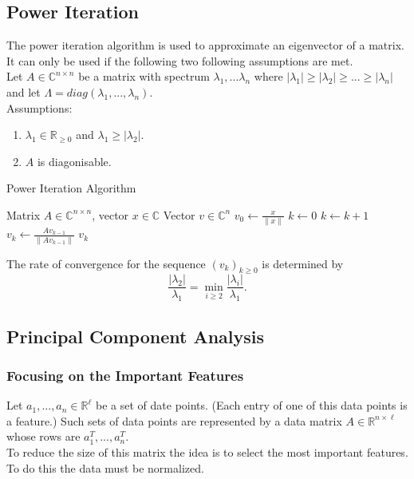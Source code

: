 \documentclass{panikzettel}
\begin{document}
\subsection{Power Iteration}
\begin{halfboxl}
\vspace{-\baselineskip}
  The power iteration algorithm is used to approximate an eigenvector of a matrix. It can only be used if the following two following assumptions are met.\\
  Let $A\in\mathbb{C}^{n\times n}$ be a matrix with spectrum $\lambda_1,...\lambda_n$ where $|\lambda_1|\geq |\lambda_2|\geq ... \geq |\lambda_n|$ and let $\Lambda = diag(\lambda_1,...,\lambda_n)$.\\
  Assumptions:
  \begin{enumerate}
  \item $\lambda_1\in\mathbb{R}_{\geq 0}$ and $\lambda_1\geq |\lambda_2|$.
  \item $A$ is diagonisable.
  \end{enumerate}
\end{halfboxl}
\begin{halfboxr}
\vspace{-\baselineskip}
\begin{algo}{Power Iteration Algorithm}
{
\renewcommand{\algorithmicrequire}{\textbf{Input:}}
\renewcommand{\algorithmicensure}{\textbf{Output:}}
  \begin{algorithmic}[1]
  \Require Matrix $A\in\mathbb{C}^{n\times n}$, vector $x\in\mathbb{C}$
  \Ensure Vector $v\in\mathbb{C}^n$
  \State $v_0\leftarrow\frac{x}{\parallel x \parallel}$
  \State $k\leftarrow 0$
  \Repeat
    \State $k\leftarrow k+1$
    \State $v_k\leftarrow \frac{Av_{k-1}}{\parallel Av_{k-1} \parallel}$
  \State \Return $v_k$
  \end{algorithmic}
}
\end{algo}
\end{halfboxr}

The rate of convergence for the sequence $(v_k)_{k\geq 0}$ is determined by
\[
\frac{|\lambda_2|}{\lambda_1}=\min_{i\geq 2}\frac{|\lambda_i|}{\lambda_1}.
\]



\subsection{Principal Component Analysis}
\subsubsection{Focusing on the Important Features}
Let $a_1,...,a_n\in\mathbb{R}^\ell$ be a set of date points. (Each entry of one of this data points is a feature.) Such sets of data points are represented by a data matrix $A\in\mathbb{R}^{n\times \ell}$ whose rows are $a_1^T,...,a_n^T$.\\
To reduce the size of this matrix the idea is to select the most important features. To do this the data must be normalized.
\end{document}

